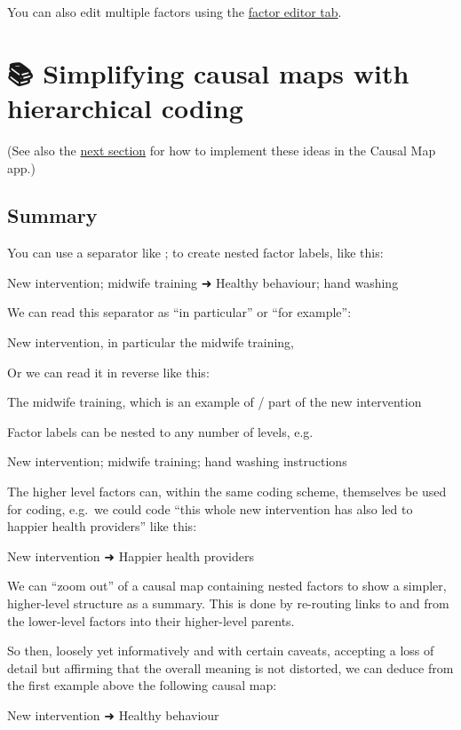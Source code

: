 \documentclass[
]{book}
\begin{document}
You can also edit multiple factors using the \protect\hyperlink{xfactor-editor}{factor editor tab}.

\hypertarget{xsimplifying-with-hierarchical}{%
\chapter{📚 Simplifying causal maps with hierarchical coding}\label{xsimplifying-with-hierarchical}}

(See also the \protect\hyperlink{xhierarchical-coding}{next section} for how to implement these ideas in the Causal Map app.)

\hypertarget{summary-3}{%
\section{Summary}\label{summary-3}}

You can use a separator like ; to create nested factor labels, like this:

New intervention; midwife training ➜ Healthy behaviour; hand washing

We can read this separator as ``in particular'' or ``for example'':

New intervention, in particular the midwife training,

Or we can read it in reverse like this:

The midwife training, which is an example of / part of the new intervention

Factor labels can be nested to any number of levels, e.g.

New intervention; midwife training; hand washing instructions

The higher level factors can, within the same coding scheme, themselves be used for coding, e.g.~we could code ``this whole new intervention has also led to happier health providers'' like this:

New intervention ➜ Happier health providers

We can ``zoom out'' of a causal map containing nested factors to show a simpler, higher-level structure as a summary. This is done by re-routing links to and from the lower-level factors into their higher-level parents.

So then, loosely yet informatively and with certain caveats, accepting a loss of detail but affirming that the overall meaning is not distorted, we can deduce from the first example above the following causal map:

New intervention ➜ Healthy behaviour
\end{document}
